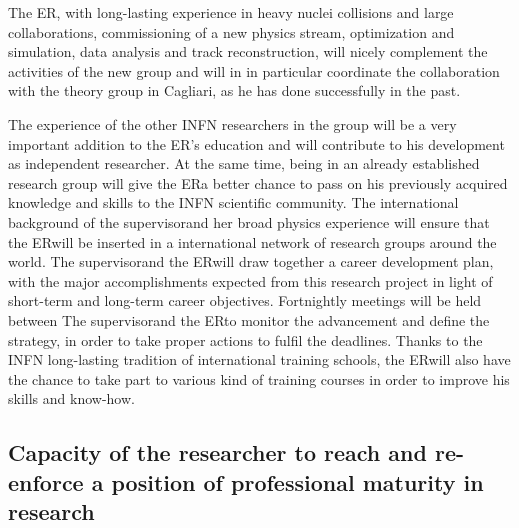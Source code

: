 \documentclass[a4paper,11pt]{article}
\newcommand{\ER}{ER}
\newcommand{\supervisor}{the supervisor}
\newcommand{\Supervisor}{The supervisor}
\begin{document}
The \ER, with long-lasting experience in heavy nuclei
collisions and large collaborations, commissioning
of a new physics stream, optimization and simulation, data analysis and track
reconstruction, will nicely complement the activities
of the new group and will in
in particular coordinate the 
collaboration with the 
theory group in Cagliari, as he has 
done successfully in the past.


The experience of the other INFN 
researchers in the group will be a very important addition to the \ER's
education and will contribute to his development as independent
researcher. At the same time, being in an already established research
group will give the \ER a better chance to pass on his previously
acquired knowledge and skills to the INFN scientific community. 
The international background of \supervisor and her 
broad physics experience will ensure that the 
\ER will be inserted in a international network of 
research groups around the world.  
\Supervisor and the \ER will draw together a career development plan,
with the major accomplishments expected from this research project in
light of short-term and long-term career objectives. Fortnightly
meetings will be held between \Supervisor and the \ER to monitor the
advancement and define the strategy, in order to take proper actions
to fulfil the deadlines. Thanks to the INFN long-lasting tradition of
international training schools, the \ER will also have the chance to take
part to various kind of training courses in order to improve his
skills and know-how.  

%              
            

\subsection{Capacity of the researcher to reach and re-enforce a position of professional maturity in research}
\label{sec:maturity}
\end{document}

